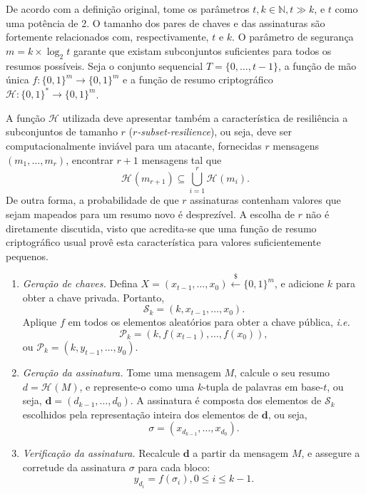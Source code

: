 \documentclass{ufsctex/ufsctex}
\newcommand{\hh}{\mathcal{H}}
\newcommand{\pk}{\mathcal{P}_k}
\newcommand{\sk}{\mathcal{S}_k}
\newcommand{\hash}[2][]{\mathcal{H}^{#1} (#2)}
\newcommand{\binwds}[1]{\{0, 1\}^{#1}}
\newcommand{\fhash}[1]{\hh{}: \binwds{*} \longrightarrow{} \binwds{#1}}
\newcommand{\random}{\stackrel{\$}{\longleftarrow}}
\begin{document}
De acordo com a definição original, tome os parâmetros $t, k \in \mathbb{N}, t
\gg k$, e $t$ como uma potência de 2.  O tamanho dos pares de chaves e das
assinaturas são fortemente relacionados com, respectivamente, $t$ e $k$. O
parâmetro de segurança $m = k \times \log_2 t$ garante que existam subconjuntos
suficientes para todos os resumos possíveis. Seja o conjunto sequencial $T =
\{0, \dots, t - 1\}$, a função de mão única $f : \binwds{m} \longrightarrow
\binwds{m}$ e a função de resumo criptográfico $\fhash{m}$.

A função $\hh{}$ utilizada deve apresentar também a característica de
resiliência a subconjuntos de tamanho $r$ (\emph{$r$-subset-resilience}), ou
seja, deve ser computacionalmente inviável para um atacante, fornecidas $r$
mensagens $(m_1, \dots, m_r)$, encontrar $r + 1$ mensagens tal que
\begin{equation}
  \hash{m_{r + 1}} \subseteq \bigcup^{r}_{i = 1} \hash{m_i}.
\end{equation}
De outra forma, a probabilidade de que $r$ assinaturas contenham valores
que sejam mapeados para um resumo novo é desprezível. A escolha de $r$ não
é diretamente discutida, visto que acredita-se que uma função de resumo
criptográfico usual provê esta característica para valores suficientemente
pequenos.

\begin{enumerate}

  \item[] \emph{Geração de chaves.} Defina $X = (x_{t - 1}, \dots, x_0)
      \random{} \binwds{m}$, e adicione $k$ para
        obter a chave privada. Portanto,
        \begin{equation}
          \sk{} = (k, x_{t - 1}, \dots, x_0).
        \end{equation}
        Aplique $f$ em todos os elementos aleatórios para obter a chave
        pública, \emph{i.e.}
        \begin{equation}
          \pk{} = (k, f(x_{t - 1}), \dots, f(x_0)),
        \end{equation}
        ou $\pk{} = (k, y_{t - 1}, \dots, y_0)$.

  \item[] \emph{Geração da assinatura.} Tome uma mensagem $M$, calcule o seu
      resumo $d = \hash{M}$, e represente-o como uma $k$-tupla de palavras em
        base-$t$, ou seja, $\mathbf{d} = (d_{k - 1}, \dots, d_0)$. A assinatura
        é composta dos elementos de $\sk{}$ escolhidos pela representação
        inteira dos elementos de $\mathbf{d}$, ou seja,
        \begin{equation}
          \sigma = (x_{d_{k - 1}}, \dots, x_{d_{0}}).
        \end{equation}

  \item[] \emph{Verificação da assinatura.} Recalcule $\mathbf{d}$ a partir da
      mensagem $M$, e assegure a corretude da assinatura $\sigma$ para cada
        bloco:
        \begin{equation}
          y_{d_{i}} = f(\sigma_{i}), 0 \leq i \leq k - 1.
        \end{equation}

\end{enumerate}
\end{document}

